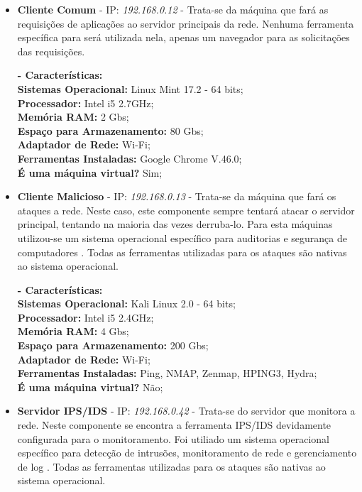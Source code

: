 		\begin{itemize}
			\item \textbf{Cliente Comum} - IP: \emph{192.168.0.12} - Trata-se da máquina que fará as requisições de aplicações ao servidor principais da rede. Nenhuma ferramenta específica para será utilizada nela, apenas um navegador para as solicitações das requisições.

			\textbf{- Características:} \\
			\textbf{Sistemas Operacional:} Linux Mint 17.2 - 64 bits; \\
			\textbf{Processador:} Intel i5 2.7GHz; \\
			\textbf{Memória RAM:} 2 Gbs; \\
			\textbf{Espaço para Armazenamento:} 80 Gbs; \\
			\textbf{Adaptador de Rede:} Wi-Fi; \\
			\textbf{Ferramentas Instaladas:} Google Chrome V.46.0; \\
			\textbf{É uma máquina virtual?} Sim; \\

			\item \textbf{Cliente Malicioso} - IP: \emph{192.168.0.13} - Trata-se da máquina que fará os ataques a rede. Neste caso, este componente sempre tentará atacar o servidor principal, tentando na maioria das vezes derruba-lo. Para esta máquinas utilizou-se um sistema operacional específico para auditorias e segurança de computadores \cite{kali}. Todas as ferramentas utilizadas para os ataques são nativas ao sistema operacional.

			\textbf{- Características:} \\
			\textbf{Sistemas Operacional:} Kali Linux 2.0 - 64 bits; \\
			\textbf{Processador:} Intel i5 2.4GHz; \\
			\textbf{Memória RAM:} 4 Gbs; \\
			\textbf{Espaço para Armazenamento:} 200 Gbs; \\
			\textbf{Adaptador de Rede:} Wi-Fi; \\
			\textbf{Ferramentas Instaladas:} Ping, NMAP, Zenmap, HPING3, Hydra; \\
			\textbf{É uma máquina virtual?} Não; \\

			\item \textbf{Servidor IPS/IDS} - IP: \emph{192.168.0.42} - Trata-se do servidor que monitora a rede. Neste componente se encontra a ferramenta IPS/IDS devidamente configurada para o monitoramento. Foi utiliado um sistema operacional específico para detecção de intrusões, monitoramento de rede e gerenciamento de log \cite{SO}. Todas as ferramentas utilizadas para os ataques são nativas ao sistema operacional.


\end{itemize}
